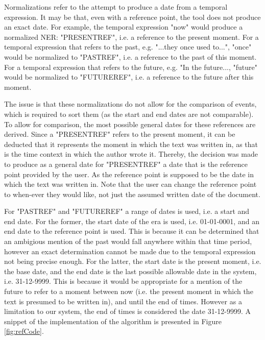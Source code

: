\par Normalizations refer to the attempt to produce a date from a temporal expression. It may be that, even with a reference point, the tool does not produce an exact date. For example, the temporal expression "now" would produce a normalized NER: "PRESENT\textunderscore REF", i.e. a reference to the present moment. For a temporal expression that refers to the past, e.g. "...they once used to...", "once" would be normalized to "PAST\textunderscore REF", i.e. a reference to the past of this moment. For a temporal expression that refers to the future, e.g. "In the future..., "future" would be normalized to "FUTURE\textunderscore REF", i.e. a reference to the future after this moment. 

\par The issue is that these normalizations do not allow for the comparison of events, which is required to sort them (as the start and end dates are not comparable). To allow for comparison, the most possible general dates for these references are derived. Since a "PRESENT\textunderscore REF" refers to the present moment, it can be deducted that it represents the moment in which the text was written in, as that is the time context in which the author wrote it. Thereby, the decision was made to produce as a general date for "PRESENT\textunderscore REF" a date that is the reference point provided by the user. As the reference point is supposed to be the date in which the text was written in. Note that the user can change the reference point to when-ever they would like, not just the assumed written date of the document. 

\par For "PAST\textunderscore REF" and "FUTURE\textunderscore REF" a range of dates is used, i.e. a start and end date. For the former, the start date of the era is used, i.e. 01-01-0001, and an end date to the reference point is used. This is because it can be determined that an ambigious mention of the past would fall anywhere within that time period, however an exact determination cannot be made due to the temporal expression not being precise enough. For the latter, the start date is the present moment, i.e. the base date, and the end date is the last possible allowable date in the system, i.e. 31-12-9999. This is because it would be appropriate for a mention of the future to refer to a moment between now (i.e. the present moment in which the text is presumed to be written in), and until the end of times. However as a limitation to our system, the end of times is considered the date 31-12-9999. A snippet of the implementation of the algorithm is presented in Figure \ref{fig:refCode}.


